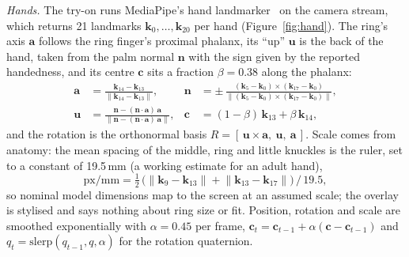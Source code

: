 \documentclass[sigconf,nonacm]{acmart}
\begin{document}
\emph{Hands.} The try-on runs MediaPipe's hand landmarker~\cite{lugaresi2019mediapipe,zhang2020hands}
on the camera stream, which returns 21 landmarks $\mathbf{k}_0, \dots, \mathbf{k}_{20}$ per hand
(Figure~\ref{fig:hand}). The ring's axis $\mathbf{a}$ follows the ring finger's proximal phalanx,
its ``up'' $\mathbf{u}$ is the back of the hand, taken from the palm normal $\mathbf{n}$ with the
sign given by the reported handedness, and its centre $\mathbf{c}$ sits a fraction $\beta = 0.38$
along the phalanx:
\begin{align}
  \mathbf{a} &= \frac{\mathbf{k}_{14} - \mathbf{k}_{13}}{\lVert \mathbf{k}_{14} - \mathbf{k}_{13} \rVert}, &
  \mathbf{n} &= \pm\,\frac{(\mathbf{k}_5 - \mathbf{k}_0) \times (\mathbf{k}_{17} - \mathbf{k}_0)}{\lVert (\mathbf{k}_5 - \mathbf{k}_0) \times (\mathbf{k}_{17} - \mathbf{k}_0) \rVert}, \label{eq:hand-axes} \\
  \mathbf{u} &= \frac{\mathbf{n} - (\mathbf{n}\cdot\mathbf{a})\,\mathbf{a}}{\lVert \mathbf{n} - (\mathbf{n}\cdot\mathbf{a})\,\mathbf{a} \rVert}, &
  \mathbf{c} &= (1-\beta)\,\mathbf{k}_{13} + \beta\,\mathbf{k}_{14}, \label{eq:hand-pose}
\end{align}
and the rotation is the orthonormal basis $R = [\,\mathbf{u} \times \mathbf{a},\ \mathbf{u},\ \mathbf{a}\,]$.
Scale comes from anatomy: the mean spacing of the middle, ring and little knuckles is the
ruler, set to a constant of 19.5\,mm (a working estimate for an adult hand),
\begin{equation}\label{eq:scale}
  \text{px/mm} = \tfrac{1}{2}\,\big(\lVert \mathbf{k}_9 - \mathbf{k}_{13}\rVert + \lVert \mathbf{k}_{13} - \mathbf{k}_{17}\rVert\big) \,/\, 19.5 ,
\end{equation}
so nominal model dimensions map to the screen at an assumed scale; the overlay is stylised and
says nothing about ring size or fit. Position, rotation and scale are smoothed
exponentially with $\alpha = 0.45$ per frame, $\mathbf{c}_t = \mathbf{c}_{t-1} + \alpha(\mathbf{c} - \mathbf{c}_{t-1})$
and $q_t = \mathrm{slerp}(q_{t-1}, q, \alpha)$ for the rotation quaternion.
\end{document}
